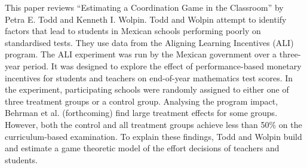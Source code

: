 
This paper reviews “Estimating a Coordination Game in the Classroom” by Petra E. Todd and Kenneth I. Wolpin. Todd and Wolpin attempt to identify factors that lead to students in Mexican schools performing poorly on standardised tests. They use data from the Aligning Learning Incentives (ALI) program. The ALI experiment was run by the Mexican government over a three- year period. It was designed to explore the effect of performance-based monetary incentives for students and teachers on end-of-year mathematics test scores. In the experiment, participating schools were randomly assigned to either one of three treatment groups or a control group.
Analysing the program impact, Behrman et al. (forthcoming) find large treatment effects for some groups. However, both the control and all treatment groups achieve less than 50\% on the curriculum-based examination. To explain these findings, Todd and Wolpin build and estimate a game theoretic model of the effort decisions of teachers and students. 
